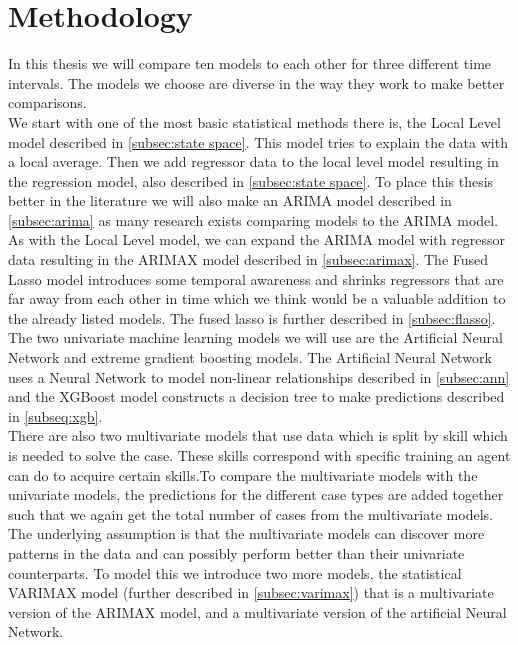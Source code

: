 \section{Methodology}
\label{seq:methodology}
In this thesis we will compare ten models to each other for three different time intervals. The models we choose are diverse in the way they work to make better comparisons.\\

We start with one of the most basic statistical methods there is, the Local Level model described in \ref{subsec:state space}. This model tries to explain the data with a local average. Then we add regressor data to the local level model resulting in the regression model, also described in \autoref{subsec:state space}. To place this thesis better in the literature we will also make an ARIMA model described in \autoref{subsec:arima} as many research exists comparing models to the ARIMA model. As with the Local Level model, we can expand the ARIMA model with regressor data resulting in the ARIMAX model described in \autoref{subsec:arimax}. The Fused Lasso model introduces some temporal awareness and shrinks regressors that are far away from each other in time which we think would be a valuable addition to the already listed models. The fused lasso is further described in \autoref{subsec:flasso}. The two univariate machine learning models we will use are the Artificial Neural Network and extreme gradient boosting models. The Artificial Neural Network uses a Neural Network to model non-linear relationships described in \autoref{subsec:ann} and the XGBoost model constructs a decision tree to make predictions described in \autoref{subseq:xgb}.\\

There are also two multivariate models that use data which is split by skill which is needed to solve the case. These skills correspond with specific training an agent can do to acquire certain skills.To compare the multivariate models with the univariate models, the predictions for the different case types are added together such that we again get the total number of cases from the multivariate models. The underlying assumption is that the multivariate models can discover more patterns in the data and can possibly perform better than their univariate counterparts. To model this we introduce two more models, the statistical VARIMAX model (further described in \autoref{subsec:varimax}) that is a multivariate version of the ARIMAX model, and a multivariate version of the artificial Neural Network.\\

